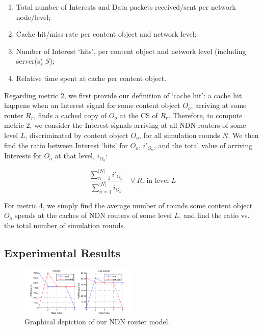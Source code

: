 \begin{enumerate}

    \item Total number of Interests and Data packets received\slash sent per network node\slash level;
    \item Cache hit\slash miss rate per content object and network level;
    \item Number of Interest `hits', per content object and network level (including 
        server(s) $S$);
    \item Relative time spent at cache per content object.\shortvertbreak

\end{enumerate}

Regarding metric 2, we first provide our definition of `cache hit': a cache hit 
happens when an Interest signal for some content object $O_o$, arriving at some 
router $R_r$, finds a cached copy of $O_o$ at the CS of $R_r$. Therefore, to 
compute metric 2, we consider the Interest signals 
arriving at all NDN routers of some level $L$, discriminated by content 
object $O_o$, for all simulation rounds $N$. We then find the ratio between Interest 
`hits' for $O_o$, $i'_{O_o}$, and the total value of arriving Interests for $O_o$ at that 
level, $i_{O_o}$:

\begin{equation}
    \frac{\sum_{n=1}^{|N|} i'_{O_o}}{\sum_{n=1}^{|N|} i_{O_o}} \quad \forall \ R_r \ \text{in level $L$}
    \label{eq:exp-setup-metrics-2}
\end{equation}\shortvertbreak

For metric 4, we simply find the average number of rounds 
some content object $O_o$ spends at the caches of NDN routers of some level $L$, and find 
the ratio vs. the total number of simulation rounds.

\subsection{Experimental Results}
\label{subsec:exp-results}

\begin{figure}[h!]

    \centering
    \includegraphics[width=0.50\textwidth]{figures/pre-test.png}
    \cprotect\caption{Graphical depiction of our NDN router model.}
    \label{fig:pre-test}

\end{figure}


